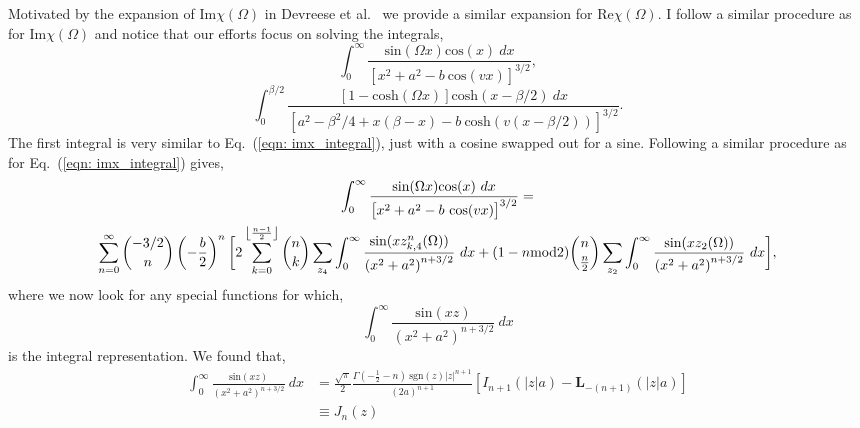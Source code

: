 Motivated by the expansion of Im$\chi(\Omega)$ in Devreese et al.~\cite{devreese_optical_1972} we provide a similar expansion for Re$\chi(\Omega)$. I follow a similar procedure as for Im$\chi(\Omega)$ and notice that our efforts focus on solving the integrals,
\begin{equation}
    \int_0^\infty \frac{\textrm{sin}(\Omega x) \textrm{cos}(x)\ dx}{\left[ x^2 + a^2 - b\ \textrm{cos}(vx) \right]^{3/2}},
\end{equation}
\begin{equation}
    \int_0^{\beta/2} \frac{\left[ 1 - \textrm{cosh}(\Omega x) \right] \textrm{cosh}(x - \beta / 2)\ dx }{\left[ a^2 - \beta^2 / 4 + x(\beta - x) - b\ \textrm{cosh}(v(x - \beta / 2)) \right]^{3/2}}.
\end{equation}
The first integral is very similar to Eq.~(\ref{eqn: imx_integral}), just with a cosine swapped out for a sine. Following a similar procedure as for Eq.~(\ref{eqn: imx_integral}) gives,
\begin{equation}
    \begin{gathered}
         \int_0^\infty \frac{\textrm{sin}(\Omega x) \textrm{cos}(x)\ dx}{\left[ x^2 + a^2 - b\ \textrm{cos}(vx) \right]^{3/2}} = \\
         \sum_{n=0}^\infty \binom{-3/2}{n} \left(-\frac{b}{2}\right)^n \bigg[2\sum_{k=0}^{\floor*{\frac{n-1}{2}}} \binom{n}{k} \sum_{z_4} \int_0^\infty \frac{\textrm{sin}(xz^n_{k,4}(\Omega))}{\left(x^2 + a^2\right)^{n + 3/2}}\ dx
         +(1-n\textrm{mod}2) \binom{n}{\frac{n}{2}} \sum_{z_2} \int_0^\infty \frac{ \textrm{sin}(xz_2(\Omega))}{\left(x^2 + a^2\right)^{n + 3/2}}\ dx \bigg],
    \end{gathered}
\end{equation}
where we now look for any special functions for which,
\begin{equation}
    \int_0^\infty \frac{\textrm{sin}(xz)}{\left(x^2 + a^2\right)^{n + 3/2}}\ dx
\end{equation}
is the integral representation. We found that,
\begin{equation}
    \begin{aligned}
        \int_0^\infty \frac{\textrm{sin}(xz)}{\left(x^2 + a^2\right)^{n + 3/2}}\ dx &= \frac{\sqrt{\pi}}{2}\frac{\Gamma(-\frac{1}{2}-n)\  \textrm{sgn}(z)|z|^{n+1}}{(2a)^{n+1}}\left[ I_{n+1}(|z|a) - \textbf{L}_{-(n+1)}(|z|a) \right] \\
        &\equiv J_n(z)
    \end{aligned}
\end{equation}
